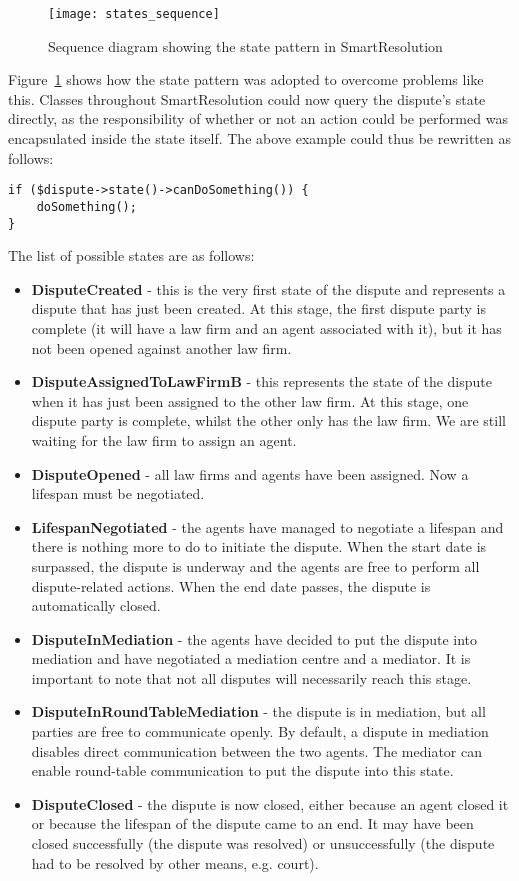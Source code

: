 \begin{figure}[h!]
  \centering
    \ifimages
    \texttt{[image: states\_sequence]}
    \fi
  \caption{Sequence diagram showing the state pattern in SmartResolution}
  \label{uml:states}
\end{figure}

Figure~\ref{uml:states} shows how the state pattern was adopted to overcome problems like this. Classes throughout SmartResolution could now query the dispute's state directly, as the responsibility of whether or not an action could be performed was encapsulated inside the state itself. The above example could thus be rewritten as follows:

\begin{lstlisting}
if ($dispute->state()->canDoSomething()) {
    doSomething();
}
\end{lstlisting}

The list of possible states are as follows:

\begin{itemize}
    \item \textbf{DisputeCreated} - this is the very first state of the dispute and represents a dispute that has just been created. At this stage, the first dispute party is complete (it will have a law firm and an agent associated with it), but it has not been opened against another law firm.
    \item \textbf{DisputeAssignedToLawFirmB} - this represents the state of the dispute when it has just been assigned to the other law firm. At this stage, one dispute party is complete, whilst the other only has the law firm. We are still waiting for the law firm to assign an agent.
    \item \textbf{DisputeOpened} - all law firms and agents have been assigned. Now a lifespan must be negotiated.
    \item \textbf{LifespanNegotiated} - the agents have managed to negotiate a lifespan and there is nothing more to do to initiate the dispute. When the start date is surpassed, the dispute is underway and the agents are free to perform all dispute-related actions. When the end date passes, the dispute is automatically closed.
    \item \textbf{DisputeInMediation} - the agents have decided to put the dispute into mediation and have negotiated a mediation centre and a mediator. It is important to note that not all disputes will necessarily reach this stage.
    \item \textbf{DisputeInRoundTableMediation} - the dispute is in mediation, but all parties are free to communicate openly. By default, a dispute in mediation disables direct communication between the two agents. The mediator can enable round-table communication to put the dispute into this state.
    \item \textbf{DisputeClosed} - the dispute is now closed, either because an agent closed it or because the lifespan of the dispute came to an end. It may have been closed successfully (the dispute was resolved) or unsuccessfully (the dispute had to be resolved by other means, e.g. court).
\end{itemize}

